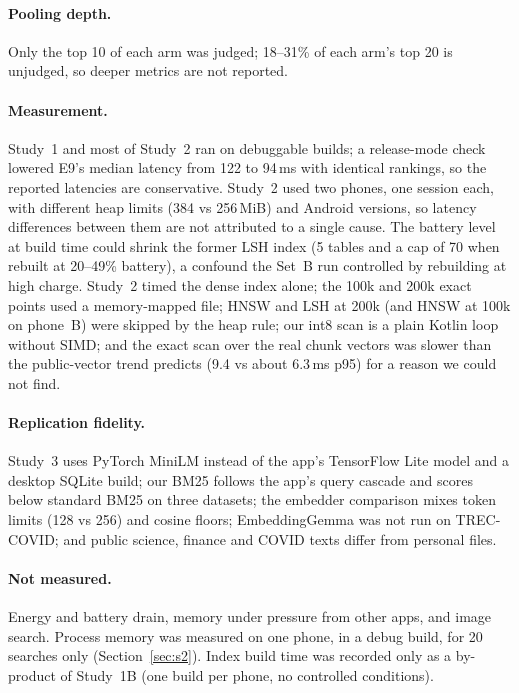\documentclass[11pt,a4paper]{article}
\begin{document}
\paragraph{Pooling depth.} Only the top 10 of each arm was judged; 18--31\% of each arm's top 20 is unjudged, so deeper metrics are not reported.

\paragraph{Measurement.} Study~1 and most of Study~2 ran on debuggable builds; a release-mode check lowered E9's median latency from 122 to 94\,ms with identical rankings, so the reported latencies are conservative. Study~2 used two phones, one session each, with different heap limits (384 vs 256\,MiB) and Android versions, so latency differences between them are not attributed to a single cause. The battery level at build time could shrink the former LSH index (5 tables and a cap of 70 when rebuilt at 20--49\% battery), a confound the Set~B run controlled by rebuilding at high charge. Study~2 timed the dense index alone; the 100k and 200k exact points used a memory-mapped file; HNSW and LSH at 200k (and HNSW at 100k on phone~B) were skipped by the heap rule; our int8 scan is a plain Kotlin loop without SIMD; and the exact scan over the real chunk vectors was slower than the public-vector trend predicts (9.4 vs about 6.3\,ms p95) for a reason we could not find.

\paragraph{Replication fidelity.} Study~3 uses PyTorch MiniLM instead of the app's TensorFlow Lite model and a desktop SQLite build; our BM25 follows the app's query cascade and scores below standard BM25 on three datasets; the embedder comparison mixes token limits (128 vs 256) and cosine floors; EmbeddingGemma was not run on TREC-COVID; and public science, finance and COVID texts differ from personal files.

\paragraph{Not measured.} Energy and battery drain, memory under pressure from other apps, and image search. Process memory was measured on one phone, in a debug build, for 20 searches only (Section~\ref{sec:s2}). Index build time was recorded only as a by-product of Study~1B (one build per phone, no controlled conditions).
\end{document}
